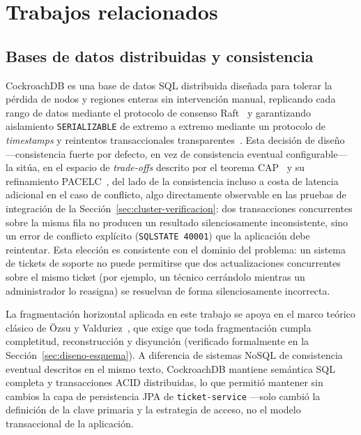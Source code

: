 \section{Trabajos relacionados}
\label{sec:trabajos-relacionados}

\subsection{Bases de datos distribuidas y consistencia}

CockroachDB es una base de datos SQL distribuida diseñada para tolerar la pérdida de nodos y
regiones enteras sin intervención manual, replicando cada rango de datos mediante el protocolo de
consenso Raft~\cite{ongaro2014raft} y garantizando aislamiento \texttt{SERIALIZABLE} de extremo a
extremo mediante un protocolo de \emph{timestamps} y reintentos transaccionales
transparentes~\cite{taft2020cockroachdb}. Esta decisión de diseño —consistencia fuerte por
defecto, en vez de consistencia eventual configurable— la sitúa, en el espacio de \emph{trade-offs}
descrito por el teorema CAP~\cite{brewer2012cap} y su refinamiento
PACELC~\cite{abadi2012consistency}, del lado de la consistencia incluso a costa de latencia
adicional en el caso de conflicto, algo directamente observable en las pruebas de integración de
la Sección~\ref{sec:cluster-verificacion}: dos transacciones concurrentes sobre la misma fila no
producen un resultado silenciosamente inconsistente, sino un error de conflicto explícito
(\texttt{SQLSTATE 40001}) que la aplicación debe reintentar. Esta elección es consistente con el
dominio del problema: un sistema de tickets de soporte no puede permitirse que dos actualizaciones
concurrentes sobre el mismo ticket (por ejemplo, un técnico cerrándolo mientras un administrador lo
reasigna) se resuelvan de forma silenciosamente incorrecta.

La fragmentación horizontal aplicada en este trabajo se apoya en el marco teórico clásico de
Özsu y Valduriez~\cite{ozsu2011principles}, que exige que toda fragmentación cumpla completitud,
reconstrucción y disyunción (verificado formalmente en la Sección~\ref{sec:diseno-esquema}). A
diferencia de sistemas NoSQL de consistencia eventual descritos en el mismo texto, CockroachDB
mantiene semántica SQL completa y transacciones ACID distribuidas, lo que permitió mantener sin
cambios la capa de persistencia JPA de \texttt{ticket-service} —solo cambió la definición de la
clave primaria y la estrategia de acceso, no el modelo transaccional de la aplicación.

